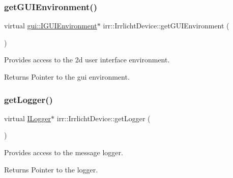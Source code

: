 \subsubsection{\texorpdfstring{get\+G\+U\+I\+Environment()}{getGUIEnvironment()}\hspace{0.1cm}{\footnotesize\ttfamily [3/3]}}
{\footnotesize\ttfamily virtual \hyperlink{classirr_1_1gui_1_1IGUIEnvironment}{gui\+::\+I\+G\+U\+I\+Environment}$\ast$ irr\+::\+Irrlicht\+Device\+::get\+G\+U\+I\+Environment (\begin{DoxyParamCaption}{ }\end{DoxyParamCaption})\hspace{0.3cm}{\ttfamily [pure virtual]}}



Provides access to the 2d user interface environment. 

\begin{DoxyReturn}{Returns}
Pointer to the gui environment. 
\end{DoxyReturn}
\mbox{\label{classirr_1_1IrrlichtDevice_adec0b0b6b71b5066dd2c7039f1f4d85b}} 
\subsubsection{\texorpdfstring{get\+Logger()}{getLogger()}\hspace{0.1cm}{\footnotesize\ttfamily [1/3]}}
{\footnotesize\ttfamily virtual \hyperlink{classirr_1_1ILogger}{I\+Logger}$\ast$ irr\+::\+Irrlicht\+Device\+::get\+Logger (\begin{DoxyParamCaption}{ }\end{DoxyParamCaption})\hspace{0.3cm}{\ttfamily [pure virtual]}}



Provides access to the message logger. 

\begin{DoxyReturn}{Returns}
Pointer to the logger. 
\end{DoxyReturn}
\mbox{\label{classirr_1_1IrrlichtDevice_adec0b0b6b71b5066dd2c7039f1f4d85b}} 
